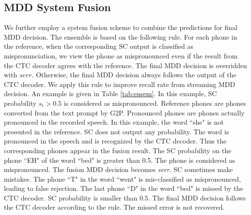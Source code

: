\documentclass[a4paper]{article}
\begin{document}
\subsection{MDD System Fusion}
We further employ a system fusion scheme to combine the predictions for final MDD decision. The ensemble is based on the following rule. For each phone in the reference, when the corresponding SC output is classified as mispronunciation, we view the phone as mispronounced even if the result from the CTC decoder agrees with the reference. The final MDD decision is overridden with $serr$. Otherwise, the final MDD decision always follows the output of the CTC decoder. We apply this rule to improve recall rate %
from streaming MDD decision.  An example is given in Table \ref{tab:ensem}. %
In this example, SC probability $s_t>0.5$ is considered as mispronounced.
Reference phones are phones converted from the text prompt by G2P. Pronounced phones are phones actually pronounced in the recorded speech. 
In this example, %
the word ``she" is not presented in the reference. SC does not output any probability.  The word is pronounced in the speech and is recognized by the CTC decoder. Thus the corresponding phones appear in the fusion result. 
The SC probability on the phone ``EH" of the word ``bed" is greater than 0.5. The phone is considered as mispronounced. The fusion MDD decision becomes \textit{serr}. 
SC sometimes make mistakes. The phone ``T" in the word ``went" is mis-classified as mispronounced, leading to false rejection.
The last phone ``D" in the word ``bed" is missed by the CTC decoder. SC probability is smaller than 0.5. The final MDD decision follows the CTC decoder according to the rule. The missed error is not recovered.
\end{document}
